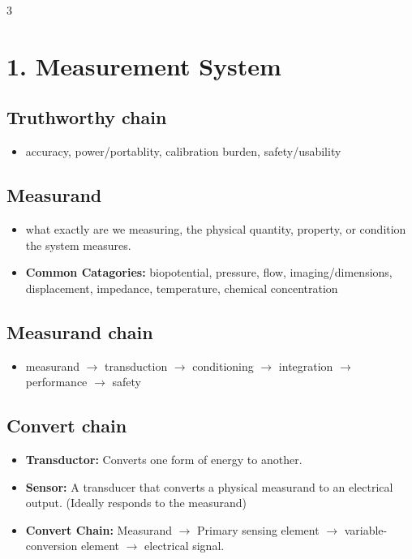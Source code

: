 \documentclass[10pt,a4paper]{ctexart}
\newcommand{\key}[1]{\textbf{#1}}
\begin{document}
\begin{multicols*}{3}
\sloppy


\section{1. Measurement System}
\subsection{Truthworthy chain}
\begin{itemize}
    \item  accuracy, power/portablity, calibration burden, safety/usability
\end{itemize}

\subsection{Measurand}
\begin{itemize}
    \item what exactly are we measuring, the physical quantity, property, 
    or condition the system measures.
    \item \key{Common Catagories:} biopotential, pressure, flow, imaging/dimensions, displacement, impedance, 
    temperature, chemical concentration
\end{itemize}

\subsection{Measurand chain}
\begin{itemize}
    \item measurand $\rightarrow$ transduction $\rightarrow$ conditioning $\rightarrow$ integration $\rightarrow$ performance $\rightarrow$ safety
\end{itemize}

\subsection{Convert chain}
\begin{itemize}
  \item \key{Transductor:} Converts one form of energy to another.
  \item \key{Sensor:} A transducer that converts a physical measurand to an electrical output. (Ideally responds to the measurand)
  \item \key{Convert Chain:} Measurand $\rightarrow$ Primary sensing element 
  $\rightarrow$ variable-conversion element $\rightarrow$ electrical signal.
\end{itemize}


\end{multicols*}
\end{document}
